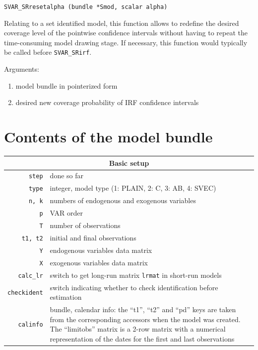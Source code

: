 \documentclass[a4paper,10pt]{article}
\newenvironment{funcdoc}[1]
{\noindent\hrulefill\newline\nopagebreak\texttt{#1}%
\nopagebreak\par\noindent\hrulefill%
\nopagebreak\par\nopagebreak\smallskip\nopagebreak\par}
{\bigskip}
\begin{document}
\begin{funcdoc}{SVAR\_SRresetalpha (bundle *Smod, scalar alpha)}
\noindent Relating to a set identified model, this function allows to redefine the 
desired coverage level of the pointwise confidence intervals without having to 
repeat the time-consuming model drawing stage. If necessary, this function would
typically be called before \texttt{SVAR\_SRirf}. 

\noindent Arguments:
 
 \begin{enumerate}
 \item model bundle in pointerized form
 \item desired new coverage probability of IRF confidence intervals 
\end{enumerate}

\end{funcdoc}


\section{Contents of the model bundle}

\label{sec:bundle_struct}

  \centering
  \begin{tabular}{rp{}}
    \hline
    \multicolumn{2}{c}{\textbf{Basic setup}} \\
    \hline
    \texttt{step} & done so far \\
    \texttt{type} & integer, model type (1: PLAIN, 2: C, 3: AB, 4: SVEC)\\
    \texttt{n, k}	  & numbers of endogenous and exogenous variables \\
    \texttt{p}	  & VAR order \\
    \texttt{T}	  & number of observations \\
    \texttt{t1, t2}	  & initial and final observations \\
    \texttt{Y}	  & endogenous variables data matrix \\
    \texttt{X}	  & exogenous variables data matrix \\
    \texttt{calc\_lr} & switch to get long-run matrix \texttt{lrmat} in short-run models \\ 
    \texttt{checkident} & switch indicating whether to check
                          identification before estimation\\
    \texttt{calinfo} & bundle, calendar info: the ``t1'', ``t2'' and
                       ``pd'' keys are taken from the corresponding
                       accessors when the model was created. The
                       ``limitobs'' matrix is a 2-row matrix with a
                       numerical representation of the dates for the
                       first and last observations
    \end{tabular}
    
\end{document}

